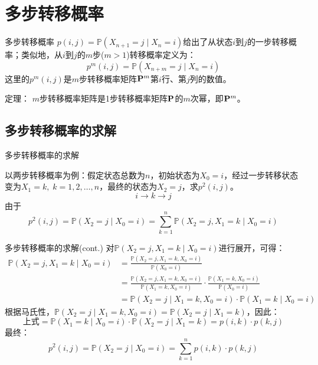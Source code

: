 \documentclass[t]{beamer}
\renewcommand{\Pr}{\mathbb{P}}
\begin{document}
\section{多步转移概率}
\begin{frame}{多步转移概率}
    $p(i,j)=\Pr(X_{n+1}=j\;|\;X_{n}=i)$给出了从状态$i$到$j$的一步转移概率；类似地，从$i$到$j$的$m$步($m>1$)转移概率定义为：
    \begin{equation*}
    p^m(i,j)=\Pr(X_{n+m}=j\;|\;X_{n}=i)
    \end{equation*} 
    这里的$p^m(i,j)$是$m$步转移概率矩阵${\bf P}^m$第$i$行、第$j$列的数值。

    \begin{block}{定理：}
        $m$步转移概率矩阵是1步转移概率矩阵${\bf P}$的$m$次幂，即${\bf P}^m$。
    \end{block}
\end{frame}

\subsection{多步转移概率的求解}
\begin{frame}{多步转移概率的求解}


以两步转移概率为例：假定状态总数为$n$，初始状态为$X_0=i$，经过一步转移状态变为$X_1=k, \;k=1,2,\ldots,n$，最终的状态为$X_2=j$，求$p^2(i,j)$。
\[i\longrightarrow k\longrightarrow j\]
由于$$p^2(i,j)=\Pr(X_2=j\;|\;X_0=i)=\sum_{k=1}^{n}\Pr(X_2=j,X_1=k\;|\;X_0=i) $$
\end{frame}

\begin{frame}{多步转移概率的求解(cont.)}
对$\Pr(X_2=j,X_1=k\;|\;X_0=i)$进行展开，可得：
\[\begin{split}
\Pr(X_2=j,X_1=k\;|\;X_0=i)&=\frac{\Pr(X_2=j,X_1=k,X_0=i)}{\Pr(X_0=i)}\\
&=\frac{\Pr(X_2=j,X_1=k,X_0=i)}{\Pr(X_1=k,X_0=i)}\cdot \frac{\Pr(X_1=k,X_0=i)}{\Pr(X_0=i)}\\
&={\Pr(X_2=j\;|\;X_1=k,X_0=i)}\cdot \Pr(X_1=k\;|\;X_0=i)
\end{split}\]
根据马氏性，$\Pr(X_2=j\;|\;X_1=k,X_0=i)=\Pr(X_2=j\;|\;X_1=k)$，因此：
\[\text{上式}=\Pr(X_1=k\;|\;X_0=i)\cdot {\Pr(X_2=j\;|\;X_1=k)}=p(i,k)\cdot {p(k,j)} \]
最终：
\[
p^2(i,j)=\Pr(X_2=j\;|\;X_0=i)=\sum_{k=1}^{n} p(i,k)\cdot p(k,j)
\]
\end{frame}
\end{document}
